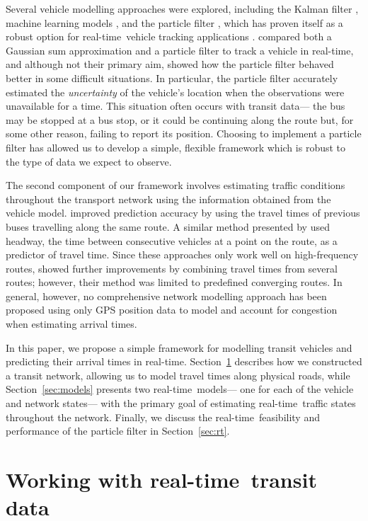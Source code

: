 \documentclass[times, doublespace]{anzsauth}
\newcommand{\rt}{real-time\ }
\begin{document}
Several vehicle modelling approaches were explored,
including the Kalman filter \citep{Dailey_2001,Cathey_2003},
machine learning models \citep{Yu_2006,Chang_2010},
and the particle filter \citep{Hans_2015},
which has proven itself as a robust option for
\rt vehicle tracking applications
\citep{Gustafsson_2002,Davidson_2011}.
\cite{Ulmke_2006} compared both a Gaussian sum approximation and a particle filter
to track a vehicle in real-time,
and although not their primary aim,
showed how the particle filter behaved better in some difficult situations.
In particular, the particle filter accurately estimated the \emph{uncertainty}
of the vehicle's location when the observations were unavailable for a time.
This situation often occurs with transit data---%
the bus may be stopped at a bus stop, or it could be continuing along the route but,
for some other reason, failing to report its position.
Choosing to implement a particle filter has allowed us
to develop a simple, flexible framework
which is robust to the type of data we expect to observe.


The second component of our framework
involves estimating traffic conditions throughout the transport network
using the information obtained from the vehicle model.
\cite{Yu_2010} improved prediction accuracy by using the travel times
of previous buses travelling along the same route.
A similar method presented by \cite{Hans_2015}
used headway, the time between consecutive vehicles at a point on the route,
as a predictor of travel time.
Since these approaches only work well on high-frequency routes,
\cite{Yu_2011} showed further improvements by combining travel times
from several routes;
however, their method was limited to predefined converging routes.
In general, however, no comprehensive network modelling approach has been proposed using
only GPS position data to model and account for congestion when estimating arrival times.

In this paper, we propose a simple framework for modelling transit vehicles and predicting
their arrival times in real-time.
Section~\ref{sec:gtfs} describes how we constructed a transit network,
allowing us to model travel times along physical roads,
while Section~\ref{sec:models} presents two \rt models---%
one for each of the vehicle and network states---%
with the primary goal of estimating \rt traffic states throughout the network.
Finally, we discuss the \rt feasibility and performance
of the particle filter in Section~\ref{sec:rt}.


\section{Working with \rt transit data}
\label{sec:gtfs}
\end{document}
